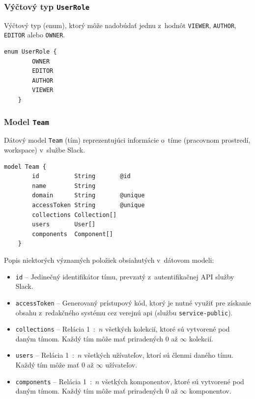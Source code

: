 \subsubsection{Výčtový typ \texttt{UserRole}}
Výčtový typ (enum), ktorý môže nadobúdať jednu z~hodnôt \texttt{VIEWER}, \texttt{AUTHOR}, \texttt{EDITOR} alebo \texttt{OWNER}. \\

\begin{lstlisting}[language={Prisma}, caption=Výčtový typ \texttt{UserRole} v~konfiguračnom súbore \texttt{prisma}.]
	enum UserRole {
		OWNER
		EDITOR
		AUTHOR
		VIEWER
	}
\end{lstlisting}

\subsubsection{Model \texttt{Team}}
Dátový model \texttt{Team} (tím) reprezentujúci informácie o~tíme (pracovnom prostredí, workspace) v~službe Slack. \\

\begin{lstlisting}[language={Prisma}, caption=Dátový model \texttt{Team} v~konfiguračnom súbore \texttt{prisma}.]
	model Team {
		id          String       @id
		name        String
		domain      String       @unique
		accessToken String       @unique
		collections Collection[]
		users       User[]
		components  Component[]
	}
\end{lstlisting}

\medskip

\noindent Popis niektorých významých položiek obsiahutých v~dátovom modeli:

\begin{itemize}
	\item \texttt{id} -- Jedinečný identifikátor tímu, prevzatý z~autentifikačnej API služby Slack.
	\item \texttt{accessToken} -- Generovaný prístupový kód, ktorý je nutné využiť pre získanie obsahu z~redakčného systému cez verejnú api (službu \texttt{service-public}). 
	\item \texttt{collections} -- Relácia 1~:~$n$ všetkých kolekcií, ktoré sú vytvorené pod daným tímom. Každý tím môže mať priradených 0 až $\infty$ kolekcií.
	\item \texttt{users} -- Relácia 1~:~$n$ všetkých užívateľov, ktorí sú členmi daného tímu. Každý tím môže mať 0 až $\infty$ užívateľov.
	\item \texttt{components} -- Relácia 1~:~$n$ všetkých komponentov, ktoré sú vytvorené pod daným tímom. Každý tím môže mať priradených 0 až $\infty$ komponentov.
\end{itemize}


